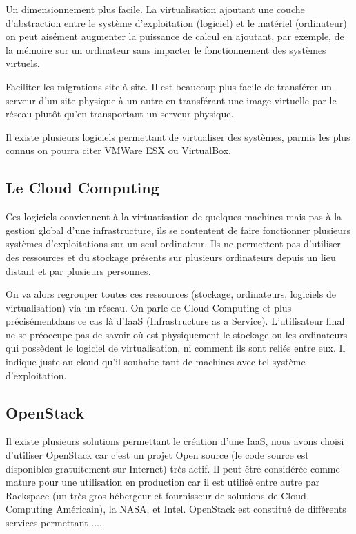 \documentclass{report}
\begin{document}
Un dimensionnement plus facile. La virtualisation ajoutant une couche d’abstraction entre le système d’exploitation (logiciel) et le matériel (ordinateur) on peut aisément augmenter la puissance de calcul en ajoutant, par exemple, de la mémoire sur un ordinateur sans impacter le fonctionnement des systèmes virtuels.

Faciliter les migrations site-à-site. Il est beaucoup plus facile de transférer un serveur d’un site physique à un autre en transférant une image virtuelle par le réseau plutôt qu’en transportant un serveur physique.\newline

Il existe plusieurs logiciels permettant de virtualiser des systèmes, parmis les plus connus on pourra citer VMWare ESX ou VirtualBox.

\subsection{Le Cloud Computing}
Ces logiciels conviennent à la virtuatisation de quelques machines mais pas à la gestion global d'une infrastructure, ils se contentent de faire fonctionner plusieurs systèmes d’exploitations sur un seul ordinateur. Ils ne permettent pas d'utiliser des ressources et du stockage présents sur plusieurs ordinateurs depuis un lieu distant et par plusieurs personnes.

On va alors regrouper toutes ces ressources (stockage, ordinateurs, logiciels de virtualisation) via un réseau. On parle de Cloud Computing et plus précisément\footnotemark[1] dans ce cas là d’IaaS (Infrastructure as a Service).
L’utilisateur final ne se préoccupe pas de savoir où est physiquement le stockage ou les ordinateurs qui possèdent le logiciel de virtualisation, ni comment ils sont reliés entre eux. Il indique juste au cloud qu’il souhaite tant de machines avec tel système d’exploitation.


\newpage
\subsection{OpenStack}
Il existe plusieurs solutions permettant le création d’une IaaS, nous avons choisi d’utiliser OpenStack car c’est un projet Open source (le code source est disponibles gratuitement sur Internet) très actif.
Il peut être considérée comme mature pour une utilisation en production car il est utilisé entre autre par Rackspace (un très gros hébergeur et fournisseur de solutions de Cloud Computing Américain), la NASA, et Intel.
OpenStack est constitué de différents services permettant .....
\end{document}
